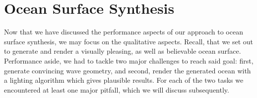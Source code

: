 \section{Ocean Surface Synthesis}
\label{sec:results:synthesis}
Now that we have discussed the performance aspects of our approach
to ocean surface synthesis, we may focus on the qualitative aspects.
Recall, that we set out to generate and render a visually pleasing,
as well as believable ocean surface. Performance aside, we had to tackle two
major challenges to reach said goal: first, generate convincing wave geometry, and second, 
render the generated ocean with a lighting algorithm which gives plausible results.
For each of the two tasks we encountered at least one major pitfall, which we will
discuss subsequently.
